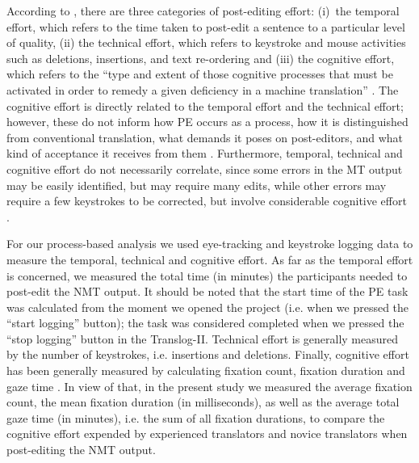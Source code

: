 \documentclass[output=paper]{langscibook}
\begin{document}
According to \citet{krings2001repairing}, there are three categories of post-editing effort: (i)~the temporal effort, which refers to the time taken to post-edit a sentence to a particular level of quality, (ii) the technical effort, which refers to keystroke and mouse activities such as deletions, insertions, and text re-ordering and (iii) the cognitive effort, which refers to the “type and extent of those cognitive processes that must be activated in order to remedy a given deficiency in a machine translation” \citep[179]{krings2001repairing}. The cognitive effort is directly related to the temporal effort and the technical effort; however, these do not inform how PE occurs as a process, how it is distinguished from conventional translation, what demands it poses on post-editors, and what kind of acceptance it receives from them \citep[61]{krings2001repairing}. Furthermore, temporal, technical and cognitive effort do not necessarily correlate, since some errors in the MT output may be easily identified, but may require many edits, while other errors may require a few keystrokes to be corrected, but involve considerable cognitive effort \citep{krings2001repairing, koponen2012comparing, KoponenNikulin2019}.

For our process-based analysis we used eye-tracking and keystroke logging data to measure the temporal, technical and cognitive effort. As far as the temporal effort is concerned, we measured the total time (in minutes) the participants needed to post-edit the NMT output. It should be noted that the start time of the PE task was calculated from the moment we opened the project (i.e. when we pressed the “start logging” button); the task was considered completed when we pressed the “stop logging” button in the Translog-II. Technical effort is generally measured by the number of keystrokes, i.e. insertions and deletions. Finally, cognitive effort has been generally measured by calculating fixation count, fixation duration and gaze time \citep{SharminJakobsen2008, CarlJakobsen2011, Mesa-Lao2014, JiaWang2019, DohertyCarl2010, ElmingCarl2014}. In view of that, in the present study we measured the average fixation count, the mean fixation duration (in milliseconds), as well as the average total gaze time (in minutes), i.e. the sum of all fixation durations, to compare the cognitive effort expended by experienced translators and novice translators when post-editing the NMT output.
\end{document}

